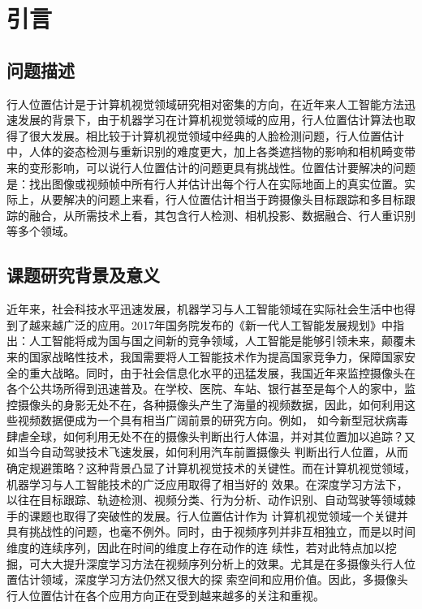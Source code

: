 
\chapter{引言}

\section{问题描述}

行人位置估计是于计算机视觉领域研究相对密集的方向，在近年来人工智能方法迅速发展的背景下，由于机器学习在计算机视觉领域的应用，行人位置估计算法也取得了很大发展。相比较于计算机视觉领域中经典的人脸检测问题，行人位置估计中，人体的姿态检测与重新识别的难度更大，加上各类遮挡物的影响和相机畸变带来的变形影响，可以说行人位置估计的问题更具有挑战性。位置估计要解决的问题是：找出图像或视频帧中所有行人并估计出每个行人在实际地面上的真实位置。实际上，从要解决的问题上来看，行人位置估计相当于跨摄像头目标跟踪和多目标跟踪的融合，从所需技术上看，其包含行人检测、相机投影、数据融合、行人重识别等多个领域。


\section{课题研究背景及意义}

近年来，社会科技水平迅速发展，机器学习与人工智能领域在实际社会生活中也得到了越来越广泛的应用。2017年国务院发布的《新一代人工智能发展规划》中指出：人工智能将成为国与国之间新的竞争领域，人工智能是能够引领未来，颠覆未来的国家战略性技术，我国需要将人工智能技术作为提高国家竞争力，保障国家安全的重大战略\cite{developPlan}。同时，由于社会信息化水平的迅猛发展，我国近年来监控摄像头在各个公共场所得到迅速普及。在学校、医院、车站、银行甚至是每个人的家中，监控摄像头的身影无处不在，各种摄像头产生了海量的视频数据，因此，如何利用这些视频数据便成为一个具有相当广阔前景的研究方向。例如，
如今新型冠状病毒肆虐全球，如何利用无处不在的摄像头判断出行人体温，并对其位置加以追踪？又如当今自动驾驶技术飞速发展，如何利用汽车前置摄像头
判断出行人位置，从而确定规避策略？这种背景凸显了计算机视觉技术的关键性。而在计算机视觉领域，机器学习与人工智能技术的广泛应用取得了相当好的
效果。在深度学习方法下，以往在目标跟踪、轨迹检测、视频分类、行为分析、动作识别、自动驾驶等领域棘手的课题也取得了突破性的发展。行人位置估计作为
计算机视觉领域一个关键并具有挑战性的问题，也毫不例外。同时，由于视频序列并非互相独立，而是以时间维度的连续序列，因此在时间的维度上存在动作的连
续性，若对此特点加以挖掘，可大大提升深度学习方法在视频序列分析上的效果。尤其是在多摄像头行人位置估计领域，深度学习方法仍然又很大的探
索空间和应用价值。因此，多摄像头行人位置估计在各个应用方向正在受到越来越多的关注和重视。
	
